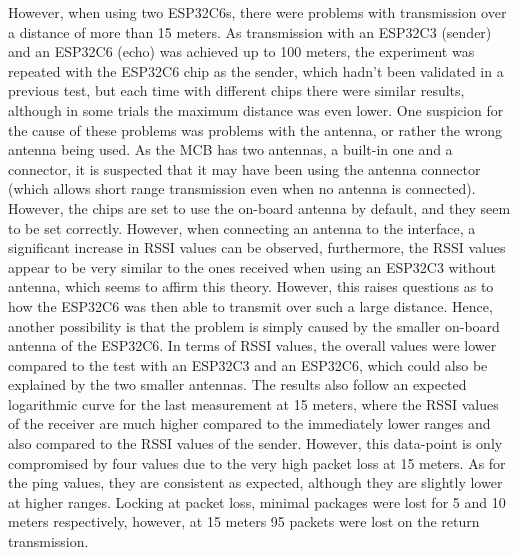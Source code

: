 However, when using two ESP32C6s, there were problems with transmission over a distance of more than 15 meters. As transmission with an ESP32C3 (sender) and an ESP32C6 (echo) was achieved up to 100 meters, the experiment was repeated with the ESP32C6 chip as the sender, which hadn't been validated in a previous test, but each time with different chips there were similar results, although in some trials the maximum distance was even lower. One suspicion for the cause of these problems was problems with the antenna, or rather the wrong antenna being used. As the MCB has two antennas, a built-in one and a connector, it is suspected that it may have been using the antenna connector (which allows short range transmission even when no antenna is connected). However, the chips are set to use the on-board antenna by default, and they seem to be set correctly. However, when connecting an antenna to the interface, a significant increase in RSSI values can be observed, furthermore, the RSSI values appear to be very similar to the ones received when using an ESP32C3 without antenna, which seems to affirm this theory. However, this raises questions as to how the ESP32C6 was then able to transmit over such a large distance. Hence, another possibility is that the problem is simply caused by the smaller on-board antenna of the ESP32C6. 
In terms of RSSI values, the overall values were lower compared to the test with an ESP32C3 and an ESP32C6, which could also be explained by the two smaller antennas. The results also follow an expected logarithmic curve for the last measurement at 15 meters, where the RSSI values of the receiver are much higher compared to the immediately lower ranges and also compared to the RSSI values of the sender. However, this data-point is only compromised by four values due to the very high packet loss at 15 meters.
As for the ping values, they are consistent as expected, although they are slightly lower at higher ranges.
Locking at packet loss, minimal packages were lost for 5 and 10 meters respectively, however, at 15 meters 95 packets were lost on the return transmission.

